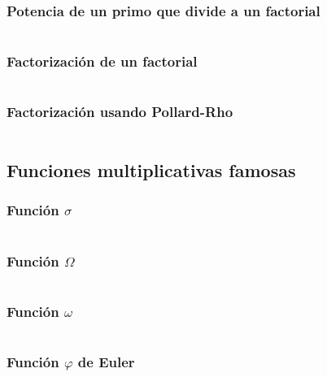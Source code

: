 \documentclass[11pt]{article}
\begin{document}
			\subsubsection{Potencia de un primo que divide a un factorial}
			\inputminted[tabsize=2,breaklines,firstline=418,lastline=422,fontsize=\small]{c++}{numberTheory.cpp}
			
			\subsubsection{Factorización de un factorial}
			\inputminted[tabsize=2,breaklines,firstline=424,lastline=431,fontsize=\small]{c++}{numberTheory.cpp}
			
			\subsubsection{Factorización usando Pollard-Rho}
			\inputminted[tabsize=2,breaklines,firstline=657,lastline=709,fontsize=\small]{c++}{numberTheory.cpp}
		
		\subsection{Funciones multiplicativas famosas}
			\subsubsection{Función $\sigma$}
			\inputminted[tabsize=2,breaklines,firstline=209,lastline=226,fontsize=\small]{c++}{numberTheory.cpp}
			
			\subsubsection{Función $\Omega$}
			\inputminted[tabsize=2,breaklines,firstline=228,lastline=235,fontsize=\small]{c++}{numberTheory.cpp}
			
			\subsubsection{Función $\omega$}
			\inputminted[tabsize=2,breaklines,firstline=237,lastline=244,fontsize=\small]{c++}{numberTheory.cpp}
			
			\subsubsection{Función $\varphi$ de Euler}
			\inputminted[tabsize=2,breaklines,firstline=251,lastline=258,fontsize=\small]{c++}{numberTheory.cpp}
			
\end{document}
